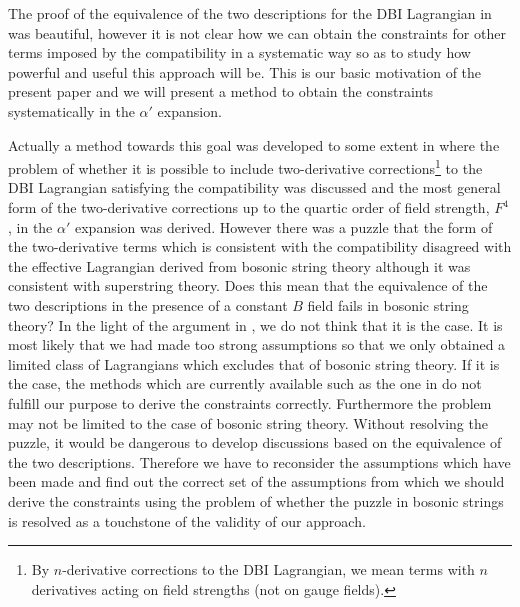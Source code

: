 \documentclass[a4paper,12pt]{article}
\begin{document}
The proof of
the equivalence of the two descriptions
for the DBI Lagrangian in \cite{SW}
was beautiful,
however it is not clear how we can obtain the constraints
for other terms
imposed by the compatibility in a systematic way
so as to study how powerful and useful this approach will be.
This is our basic motivation of the present paper
and we will present a method to obtain the constraints systematically
in the $\alpha'$ expansion.

Actually a method towards this goal was developed
to some extent in \cite{Okawa}
where the problem of
whether it is possible to include
two-derivative corrections\footnote{
By $n$-derivative corrections to the DBI Lagrangian,
we mean terms with $n$ derivatives acting on
field strengths (not on gauge fields).
} 
to the DBI Lagrangian satisfying the compatibility
was discussed
and the most general form of the two-derivative corrections
up to the quartic order of field strength, $F^4$,
in the $\alpha'$ expansion was derived.
However there was a puzzle that the form of the two-derivative terms
which is consistent with the compatibility
disagreed with
the effective Lagrangian derived from bosonic string theory
although it was consistent with superstring theory.
Does this mean that the equivalence of the two descriptions
in the presence of a constant $B$ field
fails in bosonic string theory?
In the light of the argument in \cite{SW},
we do not think that it is the case.
It is most likely that we had made too strong assumptions
so that we only obtained a limited class of Lagrangians
which excludes that of bosonic string theory.
If it is the case, the methods which are currently available
such as the one in \cite{Okawa}
do not fulfill our purpose to derive the constraints correctly.
Furthermore the problem may not be limited to the case
of bosonic string theory.
Without resolving the puzzle, it would be dangerous
to develop discussions based on the equivalence
of the two descriptions.
Therefore we have to reconsider the assumptions which have been made
and find out the correct set of the assumptions from which
we should derive the constraints
using the problem of
whether the puzzle in bosonic strings is resolved
as a touchstone of the validity of our approach.
\end{document}
